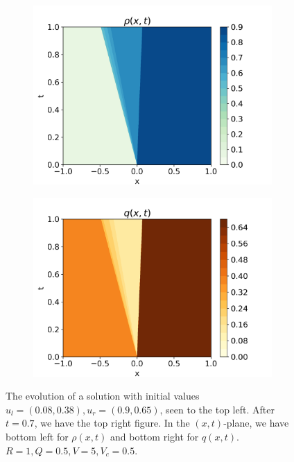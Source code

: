 \documentclass[10pt]{article}
\numberwithin{equation}{section}
\begin{document}
\begin{figure}[H]
\begin{subfigure}[b]{0.35\textwidth}
         \includegraphics[width=\textwidth]{Figures/Model/Sys3bRho.png}
     \end{subfigure}
     \begin{subfigure}[b]{0.35\textwidth}
         \centering
         \includegraphics[width=\textwidth]{Figures/Model/Sys3bQ.png}
     \end{subfigure}
        \caption{The evolution of a solution with initial values $u_l = (0.08, 0.38 ), u_r = (0.9, 0.65)$, seen to the top left. After $t = 0.7$, we have the top right figure. In the $(x,t)$-plane, we have bottom left for $\rho(x,t)$ and bottom right for $q(x,t)$. $R = 1, Q = 0.5, V = 5, V_c = 0.5$.}
        \label{fig:Example3b}
\end{figure}
\end{document}
